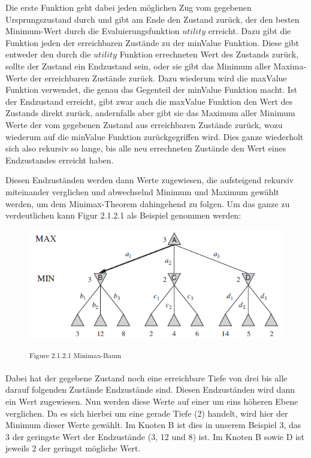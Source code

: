 Die erste Funktion geht dabei jeden möglichen Zug vom gegebenen Ursprungszustand durch und gibt am Ende den Zustand zurück, der den besten Minimum-Wert durch die Evaluierungsfunktion $utility$ erreicht. Dazu gibt die Funktion jeden der erreichbaren Zustände zu der minValue Funktion. Diese gibt entweder den durch die $utility$ Funktion errechneten Wert des Zustands zurück, sollte der Zustand ein Endzustand sein, oder sie gibt das Minimum aller Maxima-Werte der erreichbaren Zustände zurück. Dazu wiederum wird die maxValue Funktion verwendet, die genau das Gegenteil der minValue Funktion macht. Ist der Endzustand erreicht, gibt zwar auch die maxValue Funktion den Wert des Zustands direkt zurück, andernfalls aber gibt sie das Maximum aller Minimum Werte der vom gegebenen Zustand aus erreichbaren Zustände zurück, wozu wiederum auf die minValue Funktion zurückgegriffen wird. Dies ganze wiederholt sich also rekursiv so lange, bis alle neu errechneten Zustände den Wert eines Endzustandes erreicht haben.

Diesen Endzuständen werden dann Werte zugewiesen, die aufsteigend rekursiv miteinander verglichen und abwechselnd Minimum und Maximum gewählt werden, um dem Minimax-Theorem dahingehend zu folgen. Um das ganze zu verdeutlichen kann Figur 2.1.2.1 als Beispiel genommen werden:

\begin{figure}[h]
\centering
\includegraphics[width=\textwidth/5*3]{images/minimax_algorithm_tree.png}

\textsuperscript{Figure 2.1.2.1 Minimax-Baum \cite{}}\\
\end{figure}

Dabei hat der gegebene Zustand noch eine erreichbare Tiefe von drei bis alle darauf folgenden Zustände Endzustände sind. Diesen Endzuständen wird dann ein Wert zugewiesen. Nun werden diese Werte auf einer um eins höheren Ebene verglichen. Da es sich hierbei um eine gerade Tiefe (2) handelt, wird hier der Minimum dieser Werte gewählt. Im Knoten B ist dies in unserem Beispiel 3, das 3 der geringste Wert der Endzustände (3, 12 und 8) ist. Im Knoten B sowie D ist jeweils 2 der geringst mögliche Wert. 

